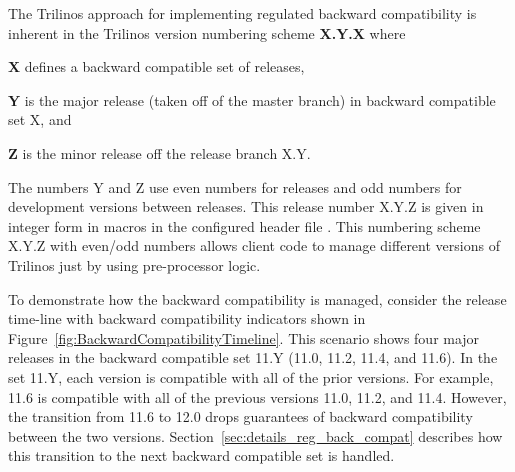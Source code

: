 \documentclass[11pt]{SANDreport}
\begin{document}
The Trilinos approach for implementing regulated backward
compatibility is inherent in the Trilinos version numbering scheme
{}\textbf{X.Y.X} where
%
\begin{compactitem}
%
{}\item\textbf{X} defines a backward compatible set of releases,
%
{}\item\textbf{Y} is the major release (taken off of the master
branch) in backward compatible set X, and
%
{}\item\textbf{Z} is the minor release off the release branch X.Y.
%
\end{compactitem}

\begin{figure}
\begin{center}
\end{center}
\end{figure}

The numbers Y and Z use even numbers for releases and odd numbers for
development versions between releases.  This release number X.Y.Z is
given in integer form in macros in the configured header file
{}.  This numbering scheme X.Y.Z with
even/odd numbers allows client code to manage different versions of
Trilinos just by using pre-processor logic.

To demonstrate how the backward compatibility is managed, consider the
release time-line with backward compatibility indicators shown in
Figure~\ref{fig:BackwardCompatibilityTimeline}.  This scenario shows
four major releases in the backward compatible set 11.Y (11.0, 11.2,
11.4, and 11.6).  In the set 11.Y, each version is compatible with all
of the prior versions.  For example, 11.6 is compatible with all of
the previous versions 11.0, 11.2, and 11.4.  However, the transition
from 11.6 to 12.0 drops guarantees of backward compatibility between
the two versions.  Section~\ref{sec:details_reg_back_compat} describes
how this transition to the next backward compatible set is handled.
\end{document}
